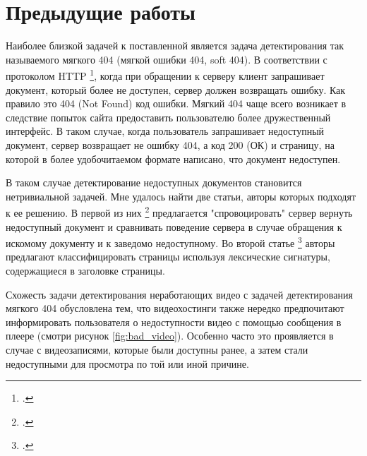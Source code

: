 \chapter{Предыдущие работы}

Наиболее близкой задачей к поставленной является задача детектирования так называемого мягкого 404 (мягкой ошибки 404, soft 404). В соответствии с протоколом HTTP \footcite{Fielding2014}, когда при обращении к серверу клиент запрашивает документ, который более не доступен, сервер должен возвращать ошибку. Как правило это 404 (Not Found) код ошибки. Мягкий 404 чаще всего возникает в следствие попыток сайта предоставить пользователю более дружественный интерфейс. В таком случае, когда пользователь запрашивает недоступный документ, сервер возвращает не ошибку 404, а код 200 (ОК) и страницу, на которой в более удобочитаемом формате написано, что документ недоступен.

В таком случае детектирование недоступных документов становится нетривиальной задачей. Мне удалось найти две статьи, авторы которых подходят к ее решению. В первой из них \footcite{Bar-Yossef2004} предлагается "спровоцировать" сервер вернуть недоступный документ и сравнивать поведение сервера в случае обращения к искомому документу и к заведомо недоступному. Во второй статье \footcite{Meneses2012} авторы предлагают классифицировать страницы используя лексические сигнатуры, содержащиеся в заголовке страницы.

Схожесть задачи детектирования неработающих видео с задачей детектирования мягкого 404 обусловлена тем, что видеохостинги также нередко предпочитают информировать пользователя о недоступности видео с помощью сообщения в плеере (смотри рисунок \ref{fig:bad_video}). Особенно часто это проявляется в случае с видеозаписями, которые были доступны ранее, а затем стали недоступными для просмотра по той или иной причине.

